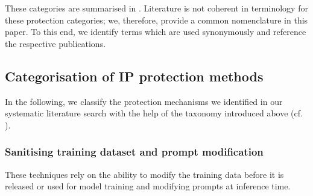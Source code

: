 \documentclass[conference,table]{IEEEtran} %
\begin{document}

These categories are summarised in . Literature is not coherent in terminology for these protection categories; we, therefore, provide a common nomenclature in this paper.
To this end, we identify terms which are
used synonymously and reference the respective publications.



\subsection{Categorisation of IP protection methods}\label{sec:mitigation-categories}
In the following, we classify the protection mechanisms we identified in our systematic literature search with the help of the taxonomy introduced above (cf. ).

\subsubsection{Sanitising training dataset and prompt modification}\label{sec:mitigation-sanitising}
These techniques rely on the ability to modify the training data before it is released or used for model training and modifying prompts at inference time.
\end{document}
